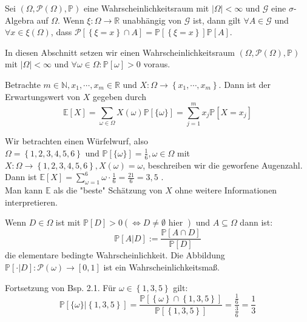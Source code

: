 Sei $ \left( \Omega , \mathcal{P} (\Omega), \mathbb{P}  \right) $ eine Wahrscheinlichkeitsraum mit $ \left| \Omega  \right| < \infty $ und
$ \mathcal{G} $ eine $\sigma$-Algebra  auf $ \Omega  $. Wenn $ \xi : \Omega \to \mathbb{R} $ unabhängig von $ \mathcal{G} $ ist, dann 
gilt $ \forall A \in \mathcal{G} $ und $ \forall x \in \xi (\Omega) $, dass $ \mathcal{P} \left[ \left\{ \xi = x \right\} \cap A \right]
= \mathbb{P}  \left[ \left\{ \xi = x \right\} \right] \mathbb{P} [A]$. 

In diesen Abschnitt setzen wir einen Wahrscheinlichkeitsraum $ \left( \Omega , \mathcal{P} (\Omega), \mathbb{P}  \right) $  mit 
$ \left| \Omega  \right| < \infty $ und $ \forall \omega  \in \Omega : \mathbb{P} [{ \omega }] > 0 $ voraus. 

Betrachte $ m \in \mathbb{N}, x_1 , \cdots,  x_m \in \mathbb{R} \text{ und } X : \Omega  \to \left\{ x_1 , \cdots,  x_m \right\} $. Dann 
ist der Erwartungswert von $ X $ gegeben durch 
$$ \mathbb{E} \left[ X \right] = \sum_{\omega \in \Omega } X (\omega ) \mathbb{P} [\{\omega \}] = \sum_{j = 1}^{m} x_j \mathbb{P} 
\left[ X = x_j \right] $$

Wir betrachten einen Würfelwurf, also $ \Omega = \left\{ 1, 2,3,4,5,6 \right\} \text{ und }  \mathbb{P} [\{ \omega  \}] = \frac{1}{6}, 
\omega  \in \Omega $ mit $ X : \Omega \to \left\{ 1, 2,3,4,5,6 \right\}, X (\omega) = \omega   $, beschreiben wir die geworfene Augenzahl. 
Dann ist $ \mathbb{E} [X] = \sum_{\omega = 1}^{6} \omega \cdot \frac{1}{6} = \frac{21}{6} = 3,5 $ .\\
Man kann $ \mathbb{E}  $ als die "beste" Schätzung von $ X $ ohne weitere Informationen interpretieren. 

Wenn $ D \in \Omega  $ ist mit $ \mathbb{P} [D] >0 \left( \iff D \neq \emptyset \text{ hier }  \right) $ und $ A \subseteq \Omega  $
dann ist: 
$$ \mathbb{P} \left[ A | D \right] := \frac{ \mathbb{P} \left[ A \cap D \right]}{ \mathbb{P} \left[ D \right]}  $$
die elementare bedingte Wahrscheinlichkeit. Die Abbildung $ \mathbb{P} \left[ \cdot | D  \right] : \mathcal{P} (\omega) \to [0,1] $ ist 
ein Wahrscheinlichkeitsmaß.

Fortsetzung von Bsp. 2.1.  Für $ \omega \in \left\{ 1, 3, 5 \right\} $ gilt:
$$ \mathbb{P} \left[ \{\omega \} | \left\{ 1, 3, 5 \right\} \right] = \frac{ \mathbb{P} \left[ \left\{ \omega  \right\} \cap \left\{ 1,3,5 \right\} \right]}{ \mathbb{P} \left[ \left\{ 1,3,5 \right\} \right]} = \frac{\frac{1}{6} }{\frac{3}{6} } = \frac{1}{3} $$

